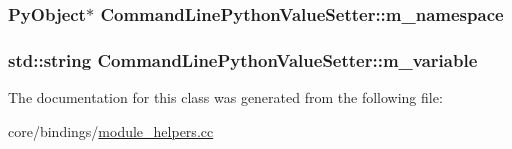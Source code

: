 \subsubsection[{\texorpdfstring{m\+\_\+namespace}{m_namespace}}]{\setlength{\rightskip}{0pt plus 5cm}Py\+Object$\ast$ Command\+Line\+Python\+Value\+Setter\+::m\+\_\+namespace\hspace{0.3cm}{\ttfamily [private]}}\hypertarget{classCommandLinePythonValueSetter_a9e34acae608b743da05378c9587ee7ad}{}\label{classCommandLinePythonValueSetter_a9e34acae608b743da05378c9587ee7ad}
\subsubsection[{\texorpdfstring{m\+\_\+variable}{m_variable}}]{\setlength{\rightskip}{0pt plus 5cm}std\+::string Command\+Line\+Python\+Value\+Setter\+::m\+\_\+variable\hspace{0.3cm}{\ttfamily [private]}}\hypertarget{classCommandLinePythonValueSetter_a01a5f8c76aae45d325d635e180e4a6ca}{}\label{classCommandLinePythonValueSetter_a01a5f8c76aae45d325d635e180e4a6ca}


The documentation for this class was generated from the following file\+:\begin{DoxyCompactItemize}
\item 
core/bindings/\hyperlink{module__helpers_8cc}{module\+\_\+helpers.\+cc}\end{DoxyCompactItemize}
